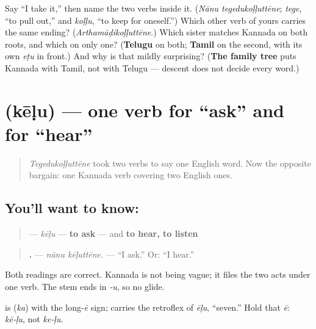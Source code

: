 \begin{tcolorbox}[breakable,colback=teal!4,colframe=teal!35!black,title={Before you move on}]
Say \textquotedblleft{}I take it,\textquotedblright{} then name the two verbs inside it. (\emph{Nānu tegedukoḷḷuttēne}; \emph{tege}, \textquotedblleft{}to pull out,\textquotedblright{} and \emph{koḷḷu}, \textquotedblleft{}to keep for oneself.\textquotedblright{}) Which other verb of yours carries the same ending? (\emph{Arthamāḍikoḷḷuttēne}.) Which sister matches Kannada on both roots, and which on only one? (\textbf{Telugu} on both; \textbf{Tamil} on the second, with its own \emph{eṭu} in front.) And why is that mildly surprising? (\textbf{The family tree} puts Kannada with Tamil, not with Telugu — descent does not decide every word.)
\end{tcolorbox}
\section[\texorpdfstring{\kn{ಕೇಳು} (kēḷu)}{ಕೇಳು (kēḷu)}]{ (kēḷu) — one verb for \textquotedblleft{}ask\textquotedblright{} and for \textquotedblleft{}hear\textquotedblright{}}

\label{lesson:KA-C34-keelu}



\begin{quote}
\emph{Tegedukoḷḷuttēne} took two verbs to say one English word. Now the opposite bargain: one Kannada verb covering two English ones.
\end{quote}

\subsection*{You'll want to know: }
\begin{quote}
\textbf{} — \emph{kēḷu} — \textbf{to ask} — and \textbf{to hear, to listen}
\end{quote}

\begin{quote}
\textbf{ .} — \emph{nānu kēḷuttēne.} — \textquotedblleft{}I ask.\textquotedblright{} Or: \textquotedblleft{}I hear.\textquotedblright{}
\end{quote}

Both readings are correct. Kannada is not being vague; it files the two acts under one verb. The stem ends in \emph{‑u}, so no glide.

\begin{sounds}
\textbf{} is \textbf{} (\emph{ka}) with the long-\emph{ē} sign; \textbf{} carries the retroflex \textbf{} of \emph{ēḷu}, \textquotedblleft{}seven.\textquotedblright{} Hold that \emph{ē}: \emph{kē‑ḷu}, not \emph{ke‑ḷu}.
\end{sounds}

